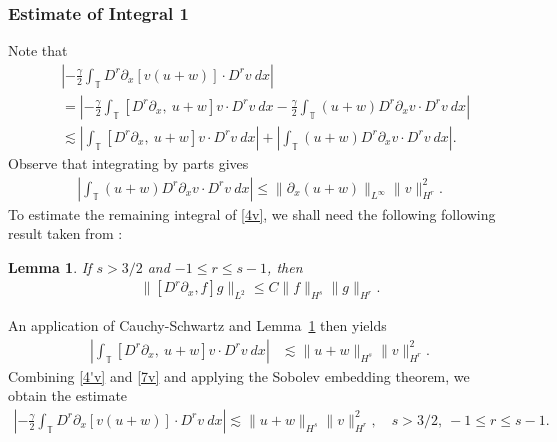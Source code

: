 \documentclass[12pt,reqno]{amsart}
\numberwithin{equation}{section}  %
\numberwithin{figure}{section}
\newcommand{\ci}{\mathbb{T}}
\newcommand{\p}{\partial}
\newtheorem{lemma}[theorem]{Lemma}
\begin{document}
\subsubsection{Estimate of Integral 1} 
Note that
%
%
\begin{equation}
\begin{split}
& \left |  -\frac{\gamma}{2} \int_{\ci} D^r \p_x [v(u+w)] \cdot
D^r v \ dx \right |
\\
& =
\left |
-\frac{\gamma}{2} \int_{\ci} \left[ D^r \p_x, \ u+w \right]v \cdot
D^r v \ dx - \frac{\gamma}{2} \int_{\ci} (u+w) D^r
\p_x v \cdot D^r v\ dx
\right | \\
& \lesssim \left |
\int_{\ci} \left[ D^r \p_x, \ u+w \right]v \cdot
D^r v \ dx \right |
+ \left | \int_{\ci} (u+w) D^r \p_x v
\cdot D^r v\
dx \right |.
\label{4v}
\end{split}
\end{equation}
%
%
Observe that integrating by parts gives
%
%
\begin{equation}
\begin{split}
\left | \int_{\ci} (u+w) D^r \p_x v \cdot
D^r v \ dx \right |
\le \|\p_x (u+w)\|_{L^\infty}
\|v\|_{H^r}^2.
\label{4'v}
\end{split}
\end{equation}
%
%
%
%
To estimate the remaining integral of \eqref{4v}, we shall need the following
following result taken from \cite{Himonas:2010p1187}:
%
\begin{lemma}
\label{cor1}
If $s > 3/2$ and $-1 \le r  \le s -1$, then
%
%
\begin{equation}
\begin{split}
\|[D^r \p_x ,f]g\|_{L^2} \le C \|f\|_{H^s} \|g\|_{H^r}.
\label{15}
\end{split}
\end{equation}
%
%
\end{lemma}
%
%
An application of 
Cauchy-Schwartz and Lemma~\ref{cor1} then yields 
%
%
\begin{equation}
\begin{split}
\left | \int_{\ci} [D^r \p_x, \ u+w] v
\cdot D^r v \ dx \right |
& \lesssim \|u+w\|_{H^s} 
\|v\|_{H^r}^2.
\label{7v}
\end{split}
\end{equation}
%
%
Combining \eqref{4'v} and \eqref{7v} and applying the Sobolev embedding 
theorem, we obtain the estimate
%
%
\begin{equation}
\begin{split}
\left |  -\frac{\gamma}{2} \int_{\ci} D^r \p_x [v(u+w)] \cdot
D^r v \ dx \right |
\lesssim \|u+w\|_{H^s} \|v\|_{H^r}^2, \quad s > 3/2, \ -1 \le r \le s-1.
\label{8v}
\end{split}
\end{equation}
%
%
\end{document}
